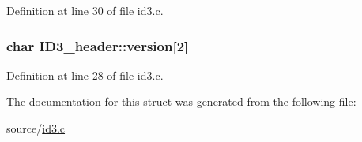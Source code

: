 Definition at line 30 of file id3.\-c.

\hypertarget{structID3__header_a9c6baaea989fcde45ea19c40b428a10c}{
\subsubsection[{version}]{\setlength{\rightskip}{0pt plus 5cm}char I\-D3\-\_\-header\-::version\mbox{[}2\mbox{]}}}\label{structID3__header_a9c6baaea989fcde45ea19c40b428a10c}


Definition at line 28 of file id3.\-c.



The documentation for this struct was generated from the following file\-:\begin{DoxyCompactItemize}
\item 
source/\hyperlink{id3_8c}{id3.\-c}\end{DoxyCompactItemize}
